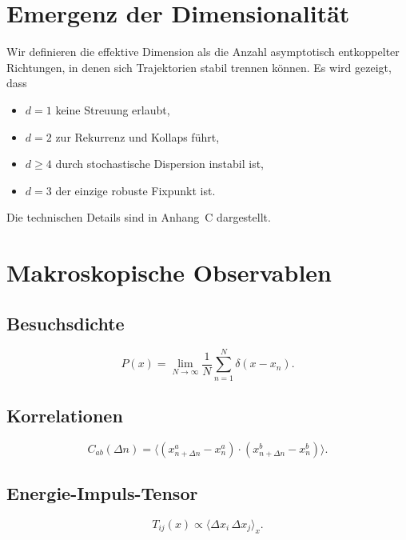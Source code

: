 \documentclass[11pt,a4paper]{article}
\begin{document}
\section{Emergenz der Dimensionalit\"at}

Wir definieren die effektive Dimension als die Anzahl asymptotisch entkoppelter Richtungen, in denen sich Trajektorien stabil trennen können. Es wird gezeigt, dass
\begin{itemize}
 \item $d=1$ keine Streuung erlaubt,
 \item $d=2$ zur Rekurrenz und Kollaps f\"uhrt,
 \item $d\geq 4$ durch stochastische Dispersion instabil ist,
 \item $d=3$ der einzige robuste Fixpunkt ist.
\end{itemize}

Die technischen Details sind in Anhang~C dargestellt.

\section{Makroskopische Observablen}

\subsection{Besuchsdichte}

\begin{equation}
 P(x) = \lim_{N\to\infty} \frac{1}{N} \sum_{n=1}^N \delta(x-x_n).
\end{equation}

\subsection{Korrelationen}

\begin{equation}
 C_{ab}(\Delta n) = \langle (x^a_{n+\Delta n}-x^a_n) \cdot (x^b_{n+\Delta n}-x^b_n) \rangle.
\end{equation}

\subsection{Energie-Impuls-Tensor}

\begin{equation}
 T_{ij}(x) \propto \langle \Delta x_i \, \Delta x_j \rangle_x.
\end{equation}
\end{document}
